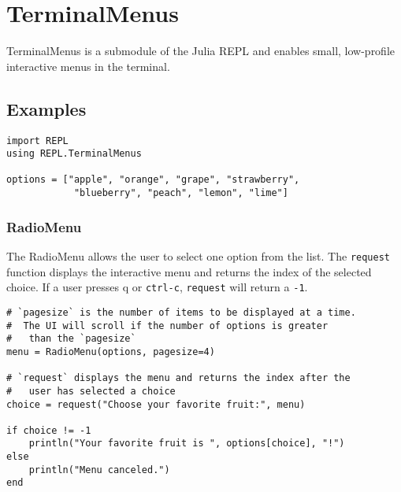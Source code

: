 \chapter{TerminalMenus}



TerminalMenus is a submodule of the Julia REPL and enables small, low-profile interactive menus in the terminal.



\hypertarget{15337950170852396133}{}


\section{Examples}




\begin{verbatim}
import REPL
using REPL.TerminalMenus

options = ["apple", "orange", "grape", "strawberry",
            "blueberry", "peach", "lemon", "lime"]

\end{verbatim}



\hypertarget{10421324822656120463}{}


\subsection{RadioMenu}



The RadioMenu allows the user to select one option from the list. The \texttt{request} function displays the interactive menu and returns the index of the selected choice. If a user presses {\textquotesingle}q{\textquotesingle} or \texttt{ctrl-c}, \texttt{request} will return a \texttt{-1}.




\begin{verbatim}
# `pagesize` is the number of items to be displayed at a time.
#  The UI will scroll if the number of options is greater
#   than the `pagesize`
menu = RadioMenu(options, pagesize=4)

# `request` displays the menu and returns the index after the
#   user has selected a choice
choice = request("Choose your favorite fruit:", menu)

if choice != -1
    println("Your favorite fruit is ", options[choice], "!")
else
    println("Menu canceled.")
end

\end{verbatim}



